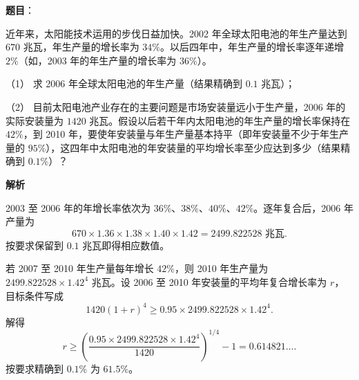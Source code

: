 \begin{answer}

\textbf{题目}：

近年来，太阳能技术运用的步伐日益加快。2002 年全球太阳电池的年生产量达到 $670$ 兆瓦，年生产量的增长率为 $34\%$。以后四年中，年生产量的增长率逐年递增 $2\%$（如，2003 年的年生产量的增长率为 $36\%$）。

（1） 求 2006 年全球太阳电池的年生产量（结果精确到 $0.1$ 兆瓦）；

（2） 目前太阳电池产业存在的主要问题是市场安装量远小于生产量，2006 年的实际安装量为 $1420$ 兆瓦。假设以后若干年内太阳电池的年生产量的增长率保持在 $42\%$，到 2010 年，要使年安装量与年生产量基本持平（即年安装量不少于年生产量的 $95\%$），这四年中太阳电池的年安装量的平均增长率至少应达到多少（结果精确到 $0.1\%$）？

\textbf{解析}


2003 至 2006 年的年增长率依次为 $36\%\text{、}38\%\text{、}40\%\text{、}42\%$。逐年复合后，2006 年产量为
\nopagebreak[4]
\[
670\times1.36\times1.38\times1.40\times1.42=2499.822528\text{ 兆瓦}.
\]
按要求保留到 $0.1$ 兆瓦即得相应数值。


若 2007 至 2010 年生产量每年增长 $42\%$，则 2010 年生产量为 $2499.822528\times1.42^4$ 兆瓦。设 2006 至 2010 年安装量的平均年复合增长率为 $r$，目标条件写成
\nopagebreak[4]
\[
1420(1+r)^4\ge0.95\times2499.822528\times1.42^4.
\]
解得
\nopagebreak[4]
\[
r\ge\left(\frac{0.95\times2499.822528\times1.42^4}{1420}\right)^{1/4}-1
=0.614821\ldots.
\]
按要求精确到 $0.1\%$ 为 $61.5\%$。



\end{answer}
